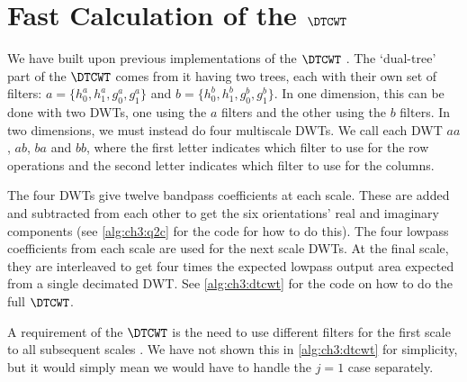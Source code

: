 \section{Fast Calculation of the $\DTCWT$}\label{sec:ch3:dtcwt}
We have built upon previous implementations of the $\DTCWT$
\cite{kingsbury_dtcwt_2003, cai_2-d_2011, wareham_dtcwt_2014}. The `dual-tree'
part of the $\DTCWT$ comes from it having two trees, each with their own set of filters:
$a = \{h_0^a, h_1^a, g_0^a, g_1^a\}$ and $b = \{h_0^b, h_1^b, g_0^b, g_1^b\}$. In one dimension, this
can be done with two DWTs, one using the $a$ filters and the other using the $b$
filters. In two dimensions, we must instead do
four multiscale DWTs. We call each DWT $aa$, $ab$, $ba$ and $bb$, where the first letter
indicates which filter to use for the row operations and the second letter
indicates which filter to use for the columns.

The four DWTs give twelve bandpass coefficients at each scale. These are added and
subtracted from each other to get the six orientations' real and imaginary
components (see \autoref{alg:ch3:q2c} for the code for how to do this). The four
lowpass coefficients from each scale are used for the next scale DWTs. At the
final scale, they are interleaved to get four times the expected lowpass output
area expected from a single decimated DWT.
See \autoref{alg:ch3:dtcwt} for the code on how to do the full $\DTCWT$.

A requirement of the $\DTCWT$ is the need to use different filters for the first
scale to all subsequent scales \cite{selesnick_dual-tree_2005}. We have not
shown this in \autoref{alg:ch3:dtcwt} for simplicity, but it would simply mean
we would have to handle the $j=1$ case separately.

